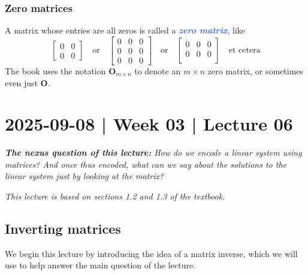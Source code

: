 \documentclass[10pt]{article}
\newcommand{\demph}[1]{\textcolor{RoyalBlue}{\textbf{\slshape #1}}} %
\theoremstyle{definition}
\begin{document}
\subsubsection{Zero matrices}

A matrix whose entries are all zeros is called a \demph{zero matrix}, like
\begin{equation*}
  \begin{bmatrix}
    0&0\\
    0&0
  \end{bmatrix}
  \quad \text{or} \quad
  \begin{bmatrix}
    0&0&0\\
    0&0&0\\
    0&0&0
  \end{bmatrix}
  \quad \text{or} \quad
  \begin{bmatrix}
    0&0&0\\
    0&0&0\\
  \end{bmatrix}
  \quad \text{et cetera}
\end{equation*}
The book uses the notation $\mathbf{O}_{m\times n}$ to denote an $m\times n$
zero matrix, or sometimes even just $\mathbf{O}$.

\newpage
\section{2025-09-08 | Week 03 | Lecture 06}

\begin{center}
  \begin{tcolorbox}[width=0.9\textwidth, colback=white, colframe=black]
    \textit{\textbf{The nexus question of this lecture:} How do we encode a
      linear system using matrices? And once thus encoded, what can we say
      about the solutions to the linear system just by looking at the matrix?}
  \end{tcolorbox}
\end{center}

\textit{This lecture is based on sections 1.2 and 1.3 of the textbook.} 


\subsection{Inverting matrices}
We begin this lecture by introducing the idea of a matrix inverse, which we
will use to help answer the main question of the lecture.
\end{document}
